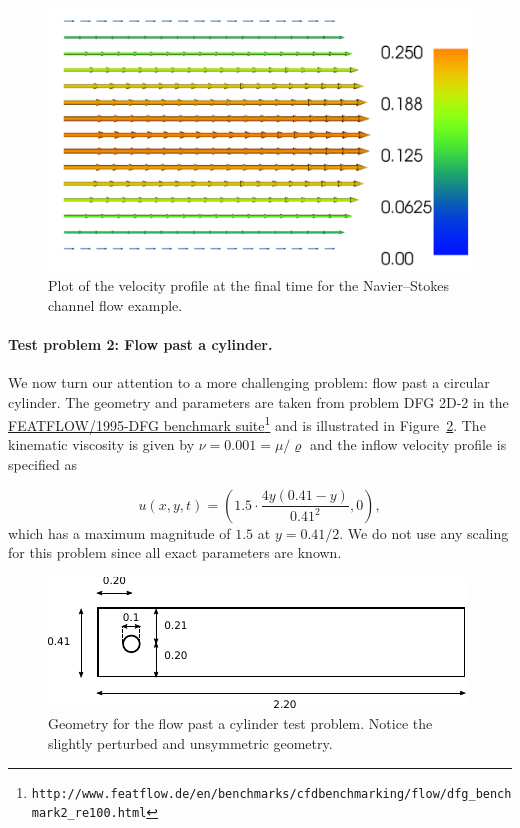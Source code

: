 \documentclass[graybox,envcountchap,sectrefs,final]{svmonodo}
\begin{document}
\begin{figure}[!ht]  %
  \centerline{\includegraphics[width=0.95\linewidth]{fig/navier_stokes_channel.png}}
  \caption{
  Plot of the velocity profile at the final time for the Navier--Stokes channel flow example. \label{ftut1:fig:navier_stokes_channel}
  }
\end{figure}



\paragraph{Test problem 2: Flow past a cylinder.}

We now turn our attention to a more challenging problem: flow
past a circular cylinder. The geometry and parameters are taken from
problem DFG 2D-2 in the \href{{http://www.featflow.de/en/benchmarks/cfdbenchmarking/flow/dfg_benchmark2_re100.html}}{FEATFLOW/1995-DFG benchmark suite}\footnote{\texttt{http://www.featflow.de/en/benchmarks/cfdbenchmarking/flow/dfg\_benchmark2\_re100.html}}
and is illustrated in Figure~\ref{ftut1:navier_stokes_cylinder:geometry}. The kinematic viscosity is
given by $\nu = 0.001 = \mu/\varrho$ and the inflow velocity profile is
specified as

\[
  u(x, y, t) = \left(1.5 \cdot \frac{4y(0.41 - y)}{0.41^2}, 0\right),
\]
which has a maximum magnitude of $1.5$ at $y = 0.41/2$. We do not
use any scaling for this problem since all exact parameters are known.


\begin{figure}[!ht]  %
  \centerline{\includegraphics[width=0.95\linewidth]{fig/navier_stokes_cylinder_geometry.pdf}}
  \caption{
  Geometry for the flow past a cylinder test problem. Notice the slightly perturbed and unsymmetric geometry. \label{ftut1:navier_stokes_cylinder:geometry}
  }
\end{figure}
\end{document}
